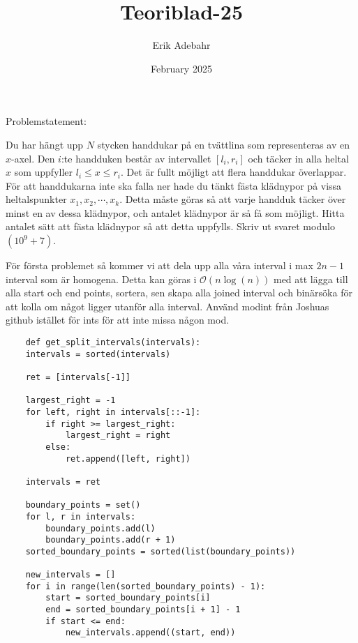 \documentclass[a4paper, 12pt]{article}
\title{Teoriblad-25}
\author{Erik Adebahr}
\date{February 2025}
\newenvironment{problem}[2][Problem]{\begin{trivlist}
\item[\hskip \labelsep {\bfseries #1}\hskip \labelsep {\bfseries #2.}]}{\end{trivlist}}
\begin{document}
\maketitle
\begin{problem}{1}
    Problemstatement:
    
    \begin{tcolorbox}[colback=white,colframe=red!75!black]
        Du har hängt upp $N$ stycken handdukar på en tvättlina som representeras av en $x$-axel. Den $i$:te handduken består av intervallet $[l_i,r_i]$ och täcker in alla heltal $x$ som uppfyller $l_i \leq x \leq r_i$. Det är fullt möjligt att flera handdukar överlappar. För att handdukarna inte ska falla ner hade du tänkt fästa klädnypor på vissa heltalspunkter $x_1,x_2,\cdots,x_k$. Detta måste göras så att varje handduk täcker över minst en av dessa klädnypor, och antalet klädnypor är så få som möjligt. Hitta antalet sätt att fästa klädnypor så att detta uppfylls. Skriv ut svaret modulo $(10^9+7)$.

    \end{tcolorbox} 

    För första problemet så kommer vi att dela upp alla våra interval i max $2n-1$ interval som är homogena. Detta kan göras i $\mathcal{O}(n\log(n))$ med att lägga till alla start och end points, sortera, sen skapa alla joined interval och binärsöka för att kolla om något ligger utanför alla interval. Använd modint från Joshuas github istället för ints för att inte missa någon mod.

    \begin{verbatim}
    def get_split_intervals(intervals):
    intervals = sorted(intervals)

    ret = [intervals[-1]]

    largest_right = -1
    for left, right in intervals[::-1]:
        if right >= largest_right:
            largest_right = right
        else:
            ret.append([left, right])

    intervals = ret

    boundary_points = set()
    for l, r in intervals:
        boundary_points.add(l)
        boundary_points.add(r + 1)
    sorted_boundary_points = sorted(list(boundary_points))

    new_intervals = []
    for i in range(len(sorted_boundary_points) - 1):
        start = sorted_boundary_points[i]
        end = sorted_boundary_points[i + 1] - 1
        if start <= end:
            new_intervals.append((start, end))


\end{verbatim}
\end{problem}
\end{document}
